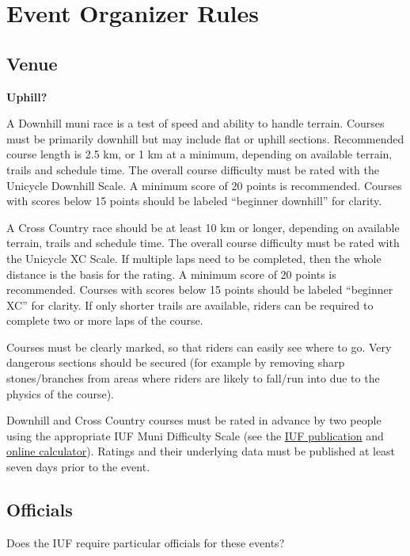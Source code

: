 \chapter{Event Organizer Rules}

\section{Venue}

\textbf{Uphill?}

A Downhill muni race is a test of speed and ability to handle terrain.
Courses must be primarily downhill but may include flat or uphill sections.
Recommended course length is 2.5 km, or 1 km at a minimum, depending on available terrain, trails and schedule time.
The overall course difficulty must be rated with the Unicycle Downhill Scale.
A minimum score of 20 points is recommended.
Courses with scores below 15 points should be labeled ``beginner downhill'' for clarity.

A Cross Country race should be at least 10 km or longer, depending on available terrain, trails and schedule time.
The overall course difficulty must be rated with the Unicycle XC Scale.
If multiple laps need to be completed, then the whole distance is the basis for the rating.
A minimum score of  20 points is  recommended. Courses with scores below 15 points should be labeled ``beginner XC'' for clarity.
If only shorter trails are available, riders can be required to complete two or more laps of the course.

Courses must be clearly marked, so that riders can easily see where to go.
Very dangerous sections should be secured (for example by removing sharp stones/branches from areas where riders are likely to fall/run into due to the physics of the course).

Downhill and Cross Country courses must be rated in advance by two people using the appropriate IUF Muni Difficulty Scale (see the \href{https://unicycling.org/files/iuf-muni-difficulty-scale.pdf}{IUF publication} and \href{https://muni-scale.info/}{online calculator}).
Ratings and their underlying data must be published at least seven days prior to the event.

\section{Officials}

\begin{framed}
Does the IUF require particular officials for these events?
\end{framed}

